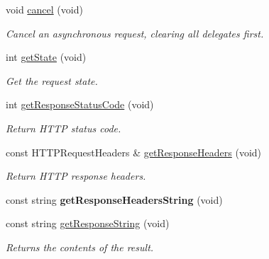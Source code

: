 \begin{DoxyCompactItemize}
\mbox{\label{classHTTPRequest_a2577169da3cd0d836cf25dc9e70b3c05}} 
void \hyperlink{classHTTPRequest_a2577169da3cd0d836cf25dc9e70b3c05}{cancel} (void)
\begin{DoxyCompactList}\small\item\em Cancel an asynchronous request, clearing all delegates first. \end{DoxyCompactList}\item 
\mbox{\label{classHTTPRequest_a8e4df0ab932f41614f282b868ece189a}} 
int \hyperlink{classHTTPRequest_a8e4df0ab932f41614f282b868ece189a}{get\+State} (void)
\begin{DoxyCompactList}\small\item\em Get the request state. \end{DoxyCompactList}\item 
\mbox{\label{classHTTPRequest_adf00190b63916546d8efa4bb7fb2cbdc}} 
int \hyperlink{classHTTPRequest_adf00190b63916546d8efa4bb7fb2cbdc}{get\+Response\+Status\+Code} (void)
\begin{DoxyCompactList}\small\item\em Return H\+T\+TP status code. \end{DoxyCompactList}\item 
\mbox{\label{classHTTPRequest_ad738d1ae9e5e68f67a9df09efdbdf81e}} 
const H\+T\+T\+P\+Request\+Headers \& \hyperlink{classHTTPRequest_ad738d1ae9e5e68f67a9df09efdbdf81e}{get\+Response\+Headers} (void)
\begin{DoxyCompactList}\small\item\em Return H\+T\+TP response headers. \end{DoxyCompactList}\item 
\mbox{\label{classHTTPRequest_a609283f6a797e6c6d4f7a655fef4d073}} 
const string {\bfseries get\+Response\+Headers\+String} (void)
\item 
\mbox{\label{classHTTPRequest_af1a031e0f79d9cac28b899b58c388b01}} 
const string \hyperlink{classHTTPRequest_af1a031e0f79d9cac28b899b58c388b01}{get\+Response\+String} (void)
\begin{DoxyCompactList}\small\item\em Returns the contents of the result. \end{DoxyCompactList}\item 

\end{DoxyCompactItemize}
